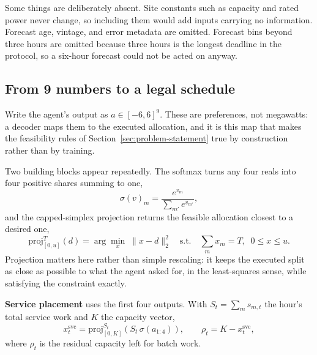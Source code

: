 ﻿\documentclass[12pt]{article}
\begin{document}
Some things are deliberately absent. Site constants such as capacity and rated
power never change, so including them would add inputs carrying no information.
Forecast age, vintage, and error metadata are omitted. Forecast bins beyond
three hours are omitted because three hours is the longest deadline in the
protocol, so a six-hour forecast could not be acted on anyway.

\subsection{From 9 numbers to a legal schedule}
\label{subsec:objective-decoder}

Write the agent's output as \(a\in[-6,6]^9\). These are preferences, not
megawatts: a decoder maps them to the executed allocation, and it is this map
that makes the feasibility rules of Section~\ref{sec:problem-statement} true by
construction rather than by training.

Two building blocks appear repeatedly. The softmax turns any four reals into
four positive shares summing to one,
\begin{equation}
  \sigma(v)_m=\frac{e^{v_m}}{\sum_{m'}e^{v_{m'}}},
  \label{eq:decoder-softmax}
\end{equation}
and the capped-simplex projection returns the feasible allocation closest to a
desired one,
\begin{equation}
  \mathrm{proj}_{[0,u]}^{T}(d)=\arg\min_{x}\;\lVert x-d\rVert_2^2
  \quad\text{s.t.}\quad \textstyle\sum_m x_m=T,\;\; 0\le x\le u.
  \label{eq:decoder-projection}
\end{equation}
Projection matters here rather than simple rescaling: it keeps the executed
split as close as possible to what the agent asked for, in the least-squares
sense, while satisfying the constraint exactly.

\textbf{Service placement} uses the first four outputs. With
\(S_t=\sum_m s_{m,t}\) the hour's total service work and \(K\) the capacity
vector,
\begin{equation}
  x^{\mathrm{svc}}_t=\mathrm{proj}_{[0,K]}^{S_t}\!\left(S_t\,\sigma(a_{1:4})\right),
  \qquad
  \rho_t = K - x^{\mathrm{svc}}_t,
  \label{eq:decoder-service}
\end{equation}
where \(\rho_t\) is the residual capacity left for batch work.
\end{document}
